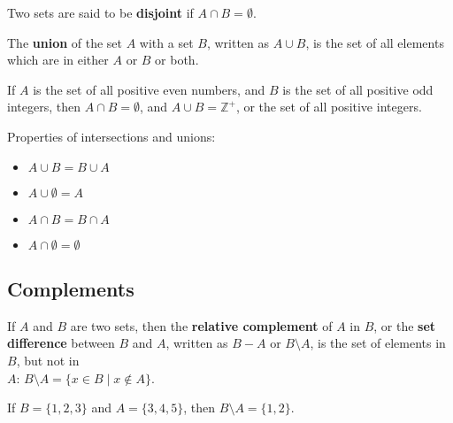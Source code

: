 \documentclass[12pt,a4paper]{article}
\begin{document}
\bigbreak

Two sets are said to be \textbf{disjoint} if $A\cap B=\emptyset$.

\bigbreak

The \textbf{union} of the set $A$ with a set $B$, written as $A\cup B$, is the set of all elements which are in either $A$ or $B$ or both.

\bigbreak

If $A$ is the set of all positive even numbers, and $B$ is the set of all positive odd integers, then $A\cap B=\emptyset$, and $A\cup B=\mathbb{Z}^{+}$, or the set of all positive integers.

\bigbreak

Properties of intersections and unions:
\begin{itemize}
	\item $A\cup B=B\cup A$
	\item $A\cup \emptyset=A$
	\item $A\cap B = B\cap A$
	\item $A\cap \emptyset = \emptyset$
\end{itemize}

\subsection*{Complements}
If $A$ and $B$ are two sets, then the \textbf{relative complement} of $A$ in $B$, or the \textbf{set difference} between $B$ and $A$, written as $B-A$ or $B\setminus A$, is the set of elements in $B$, but not in\\
$A$: $B\setminus A=\{x\in B \mid x \notin A\}$.

\bigbreak

If $B=\{1, 2, 3\}$ and $A=\{3, 4, 5\}$, then $B\setminus A=\{1,2\}$.
\end{document}
